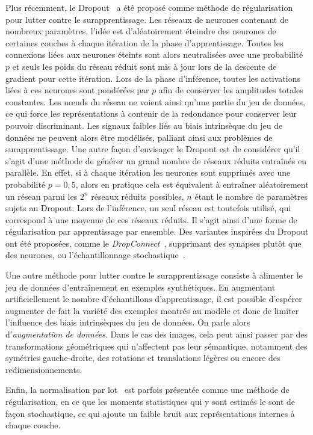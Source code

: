 Plus récemment, le Dropout~\cite{srivastava_dropout_2014} a été proposé comme méthode de régularisation pour lutter contre le surapprentissage. Les réseaux de neurones contenant de nombreux paramètres, l'idée est d'aléatoirement éteindre des neurones de certaines couches à chaque itération de la phase d'apprentissage. Toutes les connexions liées aux neurones éteints sont alors neutralisées avec une probabilité $p$ et seuls les poids du réseau réduit sont mis à jour lors de la descente de gradient pour cette itération. Lors de la phase d'inférence, toutes les activations liées à ces neurones sont pondérées par $p$ afin de conserver les amplitudes totales constantes. Les n\oe{}uds du réseau ne voient ainsi qu'une partie du jeu de données, ce qui force les représentations à contenir de la redondance pour conserver leur pouvoir discriminant. Les signaux faibles liés au biais intrinsèque du jeu de données ne peuvent alors être modélisés, palliant ainsi aux problèmes de surapprentissage. Une autre façon d'envisager le Dropout est de considérer qu'il s'agit d'une méthode de générer un grand nombre de réseaux réduits entraînés en parallèle. En effet, si à chaque itération les neurones sont supprimés avec une probabilité $p = 0,5$, alors en pratique cela est équivalent à entraîner aléatoirement un réseau parmi les $2^n$ réseaux réduits possibles, $n$ étant le nombre de paramètres sujets au Dropout. Lors de l'inférence, un seul réseau est toutefois utilisé, qui correspond à une moyenne de ces réseaux réduits. Il s'agit ainsi d'une forme de régularisation par apprentissage par ensemble. Des variantes inspirées du Dropout ont été proposées, comme le \emph{DropConnect}~\cite{wan_regularization_2013}, supprimant des synapses plutôt que des neurones, ou l'échantillonnage stochastique~\cite{zeiler_stochastic_2013}.

Une autre méthode pour lutter contre le surapprentissage consiste à alimenter le jeu de données d'entraînement en exemples synthétiques. En augmentant artificiellement le nombre d'échantillons d'apprentissage, il est possible d'espérer augmenter de fait la variété des exemples montrés au modèle et donc de limiter l'influence des biais intrinsèques du jeu de données. On parle alors d'\emph{augmentation de données}. Dans le cas des images, cela peut ainsi passer par des transformations géométriques qui n'affectent pas leur sémantique, notamment des symétries gauche-droite, des rotations et translations légères ou encore des redimensionnements.

Enfin, la normalisation par lot~\cite{ioffe_batch_2015} est parfois présentée comme une méthode de régularisation, en ce que les moments statistiques qui y sont estimés le sont de façon stochastique, ce qui ajoute un faible bruit aux représentations internes à chaque couche.

